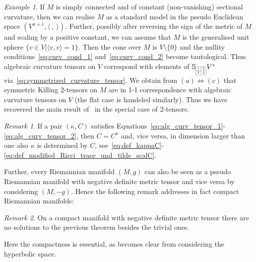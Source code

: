 \documentclass[11pt,a4paper]{article}
\theoremstyle{plain}
\theoremstyle{remark}
\newtheorem{remark}{Remark}
\newtheorem{example}{Example}
\newcommand{\bbS}{\mathbb{S}}
\begin{document}
\bigskip
\begin{example}\label{ex:constant_curvature}
If $M$ is simply connected and of constant (non-vanishing) sectional curvature, then we can realise $M$
as a standard model in the pseudo Euclidean space $(V^{n+1},\langle\ ,\ \rangle)$. Further,
possibly after reversing the sign of the metric of $M$ and scaling by a positive
constant,  we can assume that $M$ is the generalised unit sphere $\{v\in V|\langle v,v\rangle = 1\}$. Then the cone
over $M$ is $V\setminus\{0\}$ and the nullity
conditions~\eqref{eq:curv_cond_1} and~\eqref{eq:curv_cond_2} become
tautological. Thus algebraic curvature tensors on $V$ correspond with elements of $\bbS_{\scaleto{\begin{array}{|c|c|}
\cline{1-2}
1 & 2 \\
\cline{1-2}
3 & 4 \\
\cline{1-2}
\end{array}}{12pt}}V^*$ via~\eqref{eq:symmetrized_curvature_tensor}. We obtain
from $(a)\Leftrightarrow (c)$ that symmetric Killing 2-tensors on $M$  are in
1-1 correspondence with algebraic curvature tensors on $V$ (the flat case is handeled similarly).
Thus we have recovered the main result  of~\cite{McMS} in the
special case of 2-tensors.
\end{example}

\bigskip
\begin{remark}\label{re:main_2}
If a pair $(\kappa,C)$ satisfies Equations~\eqref{eq:alg_curv_tensor_1}-\eqref{eq:alg_curv_tensor_2}, 
then $C = C^\kappa$ and, vice versa, in dimension larger than one also $\kappa$ is determined by $C$, see~\eqref{eq:def_kappaC}-\eqref{eq:def_modified_Ricci_trace_und_tilde_scalC}.
\end{remark}


Further, every Riemannian manifold $(M,g)$ can also be seen as a pseudo Riemannian
manifold with negative definite metric tensor and vice versa
by considering $(M,-g)$. Hence the following remark addresses in fact compact
Riemannian manifolds: %

\bigskip
\begin{remark}\label{re:main_1}
On a compact  manifold with negative definite metric tensor there are
no solutions to the previous theorem besides the trivial ones.
\end{remark}

Here the compactness is essential, as becomes clear from considering the
hyperbolic space.
\end{document}
